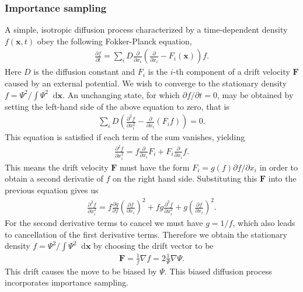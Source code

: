 \documentclass[twoside,english]{uiofysmaster}
\newcommand*\dif{\mathop{}\!\mathrm{d}}
\begin{document}
\subsubsection{Importance sampling}
 A simple, isotropic diffusion process characterized by a
time-dependent density $f(\bm{x}, t)$ obey the following Fokker-Planck
equation, \cite{Hammond1994}
\begin{align}
	\frac{\partial f}{\partial t} = \sum_i D \frac{\partial}{\partial x_i} ( \frac{\partial}{\partial x_i} - F_i(\bm{x}) ) f .
\end{align}
Here $D$ is the diffusion constant and $F_i$ is the $i$-th component
of a drift velocity $\bm{F}$ caused by an external potential. We wish
to converge to the stationary density $f = \Psi^2 / \int \Psi^2 \dif
\bm{x}$. An unchanging state, for which $\partial f / \partial t = 0$,
may be obtained by setting the left-hand side of the above equation to
zero, that is
\begin{align}
	\sum_i D(\frac{\partial^2 f}{\partial x_i^2} - \frac{\partial}{\partial x_i} (F_i f)  ) = 0.
\end{align}
This equation is satisfied if each term of the sum vanishes, yielding
\begin{align}
	\frac{\partial^2 f}{\partial x_i^2} = f \frac{\partial}{\partial x_i} F_i + F_i \frac{\partial}{\partial x_i} f.
\end{align}
This means the drift velocity $\bm{F}$ must have the form $F_i = g(f)
\partial f/ \partial x_i$ in order to obtain a second derivatie of $f$
on the right hand side. Substituting this $\bm{F}$ into the previous
equation gives us
\begin{align}
	\frac{\partial^2 f}{\partial x_i^2} = f \frac{\partial g}{\partial f} (\frac{\partial f}{\partial x_i})^2
	+ f g \frac{\partial^2 f}{\partial x_i^2} + g (\frac{\partial f}{\partial x_i})^2.
\end{align}
For the second derivative terms to cancel we must have $g = 1/f$, which also leads to cancellation of the first derivative
terms. Therefore we obtain the stationary density $f = \Psi^2 / \int \Psi^2 \dif
\bm{x}$ by choosing the drift vector to be
\begin{align}
	\bm{F} = \frac{1}{f} \nabla f = 2 \frac{1}{\Psi} \nabla \Psi.
\end{align}
This drift causes the move to be biased by $\Psi$. This biased diffusion process incorporates importance sampling.
\end{document}
